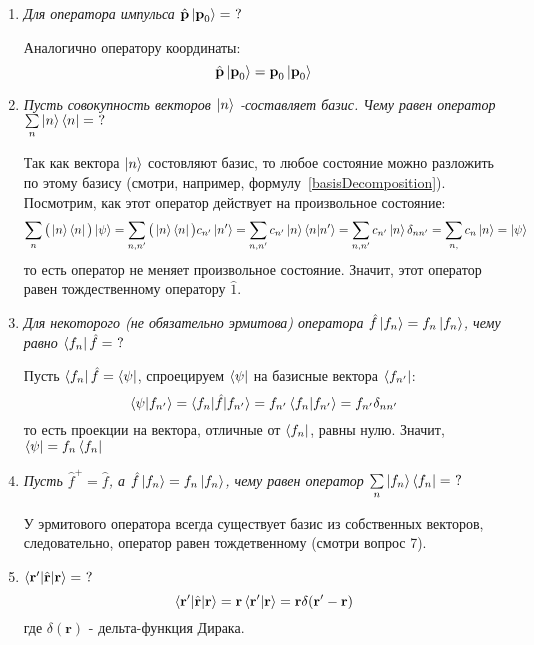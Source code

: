 \documentclass{article}
\begin{document}
\begin{enumerate}
	\item \textit{Для оператора импульса  $\hat{\textbf{p} } \ket{\textbf{p}_0} = \ ?$}
	
	Аналогично оператору координаты:
	\begin{equation}
		\hat{\textbf{p}}\ket{\textbf{p}_0} = \textbf{p}_0 \ket{\textbf{p}_0}
	\end{equation}
	
	\item \textit{Пусть совокупность векторов $\ket{n}$ -составляет базис. Чему равен оператор $\sum\limits_n \ket{n}\bra{n} = \ ?$}
	
	Так как вектора $\ket{n}$ состовляют базис, то любое состояние можно разложить по этому базису (смотри, например, формулу~\eqref{basisDecomposition}). Посмотрим, как этот оператор действует на произвольное состояние:
	\begin{equation}
		\sum\limits_n \big(\ket{n}\bra{n}\big) \ket{\psi} = \sum\limits_{n, n'} \big(\ket{n}\bra{n}\big) c_{n'}\ket{n'} = \sum\limits_{n, n'} c_{n'}\ket{n}\braket{n|n'} = \sum\limits_{n, n'} c_{n'}\ket{n}\delta_{nn'} = \sum\limits_{n,} c_{n}\ket{n} = \ket{\psi}
	\end{equation}
	то есть оператор не меняет произвольное состояние. Значит, этот оператор равен тождественному оператору $\hat{1}$.
	
	\item \textit{Для некоторого (не обязательно эрмитова) оператора $\hat{f}\ket{f_n} = f_n\ket{f_n}$, чему равно $\bra{f_n}\hat{f} = \ ?$}
	
	Пусть $\bra{f_n}\hat{f} = \bra{\psi}$, спроецируем $\bra{\psi}$ на базисные вектора $\bra{f_{n'}}$:
	\begin{equation}
		\braket{\psi|f_{n'}} = \braket{f_n|\hat{f}|f_{n'}} = f_{n'} \braket{f_n|f_{n'}} = f_{n'} \delta_{nn'}
	\end{equation}
	то есть проекции на вектора, отличные от $\bra{f_n}$, равны нулю. Значит, $\bra{\psi} = f_n\bra{f_n}$
	
	\item \textit{Пусть $\hat{f}^+=\hat{f}$, а $\hat{f}\ket{f_n} = f_n \ket{f_n}$, чему равен оператор $\sum\limits_n \ket{f_n}\bra{f_n} = \ ?$}
	
	У эрмитового оператора всегда существует базис из собственных векторов, следовательно, оператор равен тождетвенному (смотри вопрос 7).
	
	\item $\braket{\textbf{r}'|\hat{\textbf{r}}|\textbf{r}} = \ ?$
	\begin{equation}
		\braket{\textbf{r}'|\hat{\textbf{r}}|\textbf{r}} = \textbf{r} \braket{\textbf{r}'|\textbf{r}} =\textbf{r} \delta(\textbf{r}' - \textbf{r})
	\end{equation}
	где $\delta(\textbf{r})$ - дельта-функция Дирака.
	

\end{enumerate}
\end{document}
